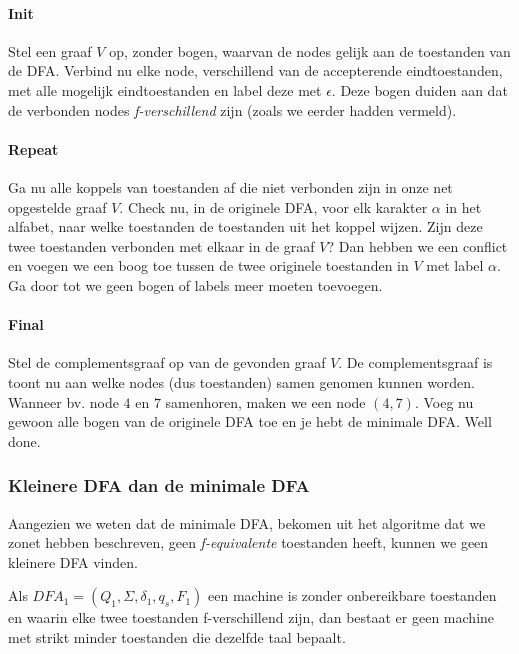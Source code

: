 \paragraph{Init} Stel een graaf $V$ op, zonder bogen, waarvan de nodes gelijk aan de toestanden van de DFA. Verbind nu elke node, verschillend van de accepterende eindtoestanden, met alle mogelijk eindtoestanden en label deze met $\epsilon$. Deze bogen duiden aan dat de verbonden nodes \textit{f-verschillend} zijn (zoals we eerder hadden vermeld).

\paragraph{Repeat} Ga nu alle koppels van toestanden af die niet verbonden zijn in onze net opgestelde graaf $V$. Check nu, in de originele DFA, voor elk karakter $\alpha$ in het alfabet, naar welke toestanden de toestanden uit het koppel wijzen. Zijn deze twee toestanden verbonden met elkaar in de graaf $V$? Dan hebben we een conflict en voegen we een boog toe tussen de twee originele toestanden in $V$ met label $\alpha$. Ga door tot we geen bogen of labels meer moeten toevoegen.

\paragraph{Final} Stel de complementsgraaf op van de gevonden graaf $V$. De complementsgraaf is toont nu aan welke nodes (dus toestanden) samen genomen kunnen worden. Wanneer bv. node $4$ en $7$ samenhoren, maken we een node $(4,7)$. Voeg nu gewoon alle bogen van de originele DFA toe en je hebt de minimale DFA. Well done.

\subsubsection*{Kleinere DFA dan de minimale DFA}

Aangezien we weten dat de minimale DFA, bekomen uit het algoritme dat we zonet hebben beschreven, geen \textit{f-equivalente} toestanden heeft, kunnen we geen kleinere DFA vinden.

\begin{theorem}
	Als $DFA_1 = (Q_1,\Sigma,\delta_1,q_s,F_1)$ een machine is zonder onbereikbare toestanden en waarin elke twee toestanden f-verschillend zijn, dan bestaat er geen machine met strikt minder toestanden die dezelfde taal bepaalt.
\end{theorem}

